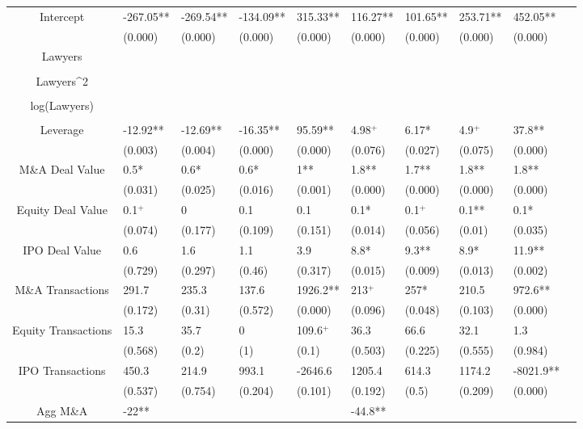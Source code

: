 \documentclass{article}
\begin{document}
\begin{table}[H]
\begin{tabular}{|clllllllll|}
Intercept & -267.05** & -269.54** & -134.09** & 315.33** & 116.27** & 101.65** & 253.71** & 452.05** & \\
   & (0.000) & (0.000) & (0.000) & (0.000) & (0.000) & (0.000) & (0.000) & (0.000) & \\
  Lawyers &  &  &  &  &  &  &  &  & \\
   &  &  &  &  &  &  &  &  & \\
  Lawyers^2 &  &  &  &  &  &  &  &  & \\
   &  &  &  &  &  &  &  &  & \\
  log(Lawyers) &  &  &  &  &  &  &  &  & \\
   &  &  &  &  &  &  &  &  & \\
  Leverage & -12.92** & -12.69** & -16.35** & 95.59** & 4.98$^{+}$ & 6.17* & 4.9$^{+}$ & 37.8** & \\
   & (0.003) & (0.004) & (0.000) & (0.000) & (0.076) & (0.027) & (0.075) & (0.000) & \\
  M\&A Deal Value & 0.5* & 0.6* & 0.6* & 1** & 1.8** & 1.7** & 1.8** & 1.8** & \\
   & (0.031) & (0.025) & (0.016) & (0.001) & (0.000) & (0.000) & (0.000) & (0.000) & \\
  Equity Deal Value & 0.1$^{+}$ & 0 & 0.1 & 0.1 & 0.1* & 0.1$^{+}$ & 0.1** & 0.1* & \\
   & (0.074) & (0.177) & (0.109) & (0.151) & (0.014) & (0.056) & (0.01) & (0.035) & \\
  IPO Deal Value & 0.6 & 1.6 & 1.1 & 3.9 & 8.8* & 9.3** & 8.9* & 11.9** & \\
   & (0.729) & (0.297) & (0.46) & (0.317) & (0.015) & (0.009) & (0.013) & (0.002) & \\
  M\&A Transactions & 291.7 & 235.3 & 137.6 & 1926.2** & 213$^{+}$ & 257* & 210.5 & 972.6** & \\
   & (0.172) & (0.31) & (0.572) & (0.000) & (0.096) & (0.048) & (0.103) & (0.000) & \\
  Equity Transactions & 15.3 & 35.7 & 0 & 109.6$^{+}$ & 36.3 & 66.6 & 32.1 & 1.3 & \\
   & (0.568) & (0.2) & (1) & (0.1) & (0.503) & (0.225) & (0.555) & (0.984) & \\
  IPO Transactions & 450.3 & 214.9 & 993.1 & -2646.6 & 1205.4 & 614.3 & 1174.2 & -8021.9** & \\
   & (0.537) & (0.754) & (0.204) & (0.101) & (0.192) & (0.5) & (0.209) & (0.000) & \\
  Agg M\&A & -22** &  &  &  & -44.8** &  &  &  & \\

\end{tabular}
\end{table}
\end{document}
